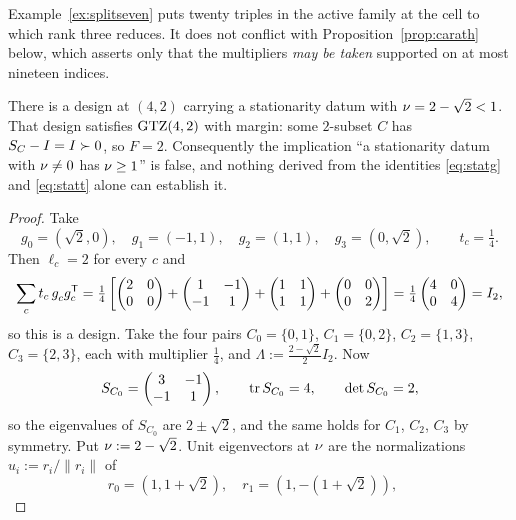 Example~\ref{ex:splitseven} puts twenty triples in the active family at
the cell to which rank three reduces.  It does not conflict
with Proposition~\ref{prop:carath} below, which asserts only that the
multipliers \emph{may be taken} supported on at most nineteen indices.

\begin{theorem}[Lean]\label{thm:reach}
There is a design at $(4,2)$ carrying a stationarity datum with
$\nu=2-\sqrt2<1$.  That design satisfies $\mathrm{GTZ}(4,2)$ with margin: some
$2$-subset $C$ has $S_{C}-I=I\succ0$, so $F=2$.  Consequently the
implication ``a stationarity datum with $\nu\ne0$ has $\nu\ge1$'' is false,
and nothing derived from the identities \eqref{eq:statg} and
\eqref{eq:statt} alone can establish it.
\end{theorem}

\begin{proof}
Take
\[
  g_0=(\sqrt2,0),\quad g_1=(-1,1),\quad g_2=(1,1),\quad g_3=(0,\sqrt2),
  \qquad t_c=\tfrac14 .
\]
Then $\ell_c=2$ for every $c$ and
\[
  \sum_ct_c\,g_c^{\vphantom{\mathsf{T}}}g_c\tp
  =\tfrac14\left[
    \begin{pmatrix}2&0\\0&0\end{pmatrix}
   +\begin{pmatrix}1&-1\\-1&1\end{pmatrix}
   +\begin{pmatrix}1&1\\1&1\end{pmatrix}
   +\begin{pmatrix}0&0\\0&2\end{pmatrix}\right]
  =\tfrac14\begin{pmatrix}4&0\\0&4\end{pmatrix}=I_2 ,
\]
so this is a design.  Take the four pairs $C_0=\{0,1\}$, $C_1=\{0,2\}$,
$C_2=\{1,3\}$, $C_3=\{2,3\}$, each with multiplier $\tfrac14$, and
$\Lambda:=\tfrac{2-\sqrt2}{2}I_2$.  Now
\[
  S_{C_0}=\begin{pmatrix}3&-1\\-1&1\end{pmatrix},
  \qquad \operatorname{tr} S_{C_0}=4,\qquad\det S_{C_0}=2,
\]
so the eigenvalues of $S_{C_0}$ are $2\pm\sqrt2$, and the same holds for
$C_1$, $C_2$, $C_3$ by symmetry.  Put $\nu:=2-\sqrt2$.  Unit eigenvectors
at $\nu$ are the normalizations $u_i:=r_i/\lVert r_i\rVert$ of
\[
  r_0=(1,1+\sqrt2),\quad r_1=(1,-(1+\sqrt2)),\quad
\]
\end{proof}

